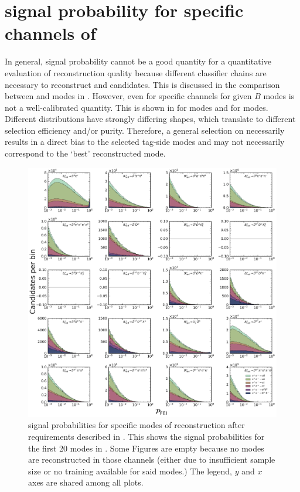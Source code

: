 \chapter{\texorpdfstring{\FEI}{FEI} signal probability for specific channels of \texorpdfstring{\B}{B}}\label{sec:appendix_fei_signal_probabilities}

In general, \FEI signal probability cannot be a good quantity for a quantitative evaluation of reconstruction quality because different classifier chains are necessary to reconstruct \Bp and \Bz candidates.
This is discussed in the comparison between \feiBp and \feiBz modes in .
However, even for specific channels for given $B$ modes \feiProb is not a well-calibrated quantity.
This is shown in  for \Bp modes and  for \Bz modes.
Different distributions have strongly differing shapes, which translate to different selection efficiency and/or purity.
Therefore, a general selection on \feiProb necessarily results in a direct bias to the 
selected tag-side modes and may not necessarily correspond to the `best' reconstructed mode.

\begin{figure}[htbp!]
    \centering
    \includegraphics[width=1\textwidth]{figures/appendices/FEI_signal_probabilities/Bp_feiSigProbs1.pdf}
    \caption{\label{fig:feisigprobs1} \FEI signal probabilities for specific modes of \Bp reconstruction after requirements described in .
    This shows the signal probabilities for the first 20 \Bp modes in .
    Some Figures are empty because no modes are reconstructed in those channels (either due to insufficient sample size or no training available for said modes.)
    The legend, $y$ and $x$ axes are shared among all plots.
    }
\end{figure}

